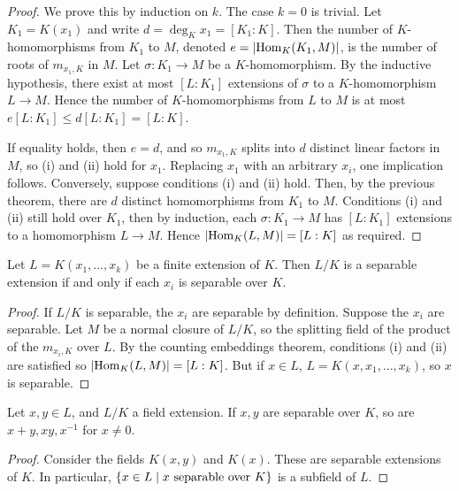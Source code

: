 \begin{proof}
	We prove this by induction on \( k \).
	The case \( k = 0 \) is trivial.
	Let \( K_1 = K(x_1) \) and write \( d = \deg_K x_1 = [K_1 : K] \).
	Then the number of \( K \)-homomorphisms from \( K_1 \) to \( M \), denoted \( e = \abs{\mathrm{Hom}_K(K_1,M)} \), is the number of roots of \( m_{x_1,K} \) in \( M \).
	Let \( \sigma : K_1 \to M \) be a \( K \)-homomorphism.
	By the inductive hypothesis, there exist at most \( [L : K_1] \) extensions of \( \sigma \) to a \( K \)-homomorphism \( L \to M \).
	Hence the number of \( K \)-homomorphisms from \( L \) to \( M \) is at most \( e[L : K_1] \leq d[L : K_1] = [L : K] \).

	If equality holds, then \( e = d \), and so \( m_{x_1,K} \) splits into \( d \) distinct linear factors in \( M \), so (i) and (ii) hold for \( x_1 \).
	Replacing \( x_1 \) with an arbitrary \( x_i \), one implication follows.
	Conversely, suppose conditions (i) and (ii) hold.
	Then, by the previous theorem, there are \( d \) distinct homomorphisms from \( K_1 \) to \( M \).
	Conditions (i) and (ii) still hold over \( K_1 \), then by induction, each \( \sigma \colon K_1 \to M \) has \( [L : K_1] \) extensions to a homomorphism \( L \to M \).
	Hence \( \abs{\mathrm{Hom}_K(L,M)} = [L : K] \) as required.
\end{proof}
\begin{theorem}
	Let \( L = K(x_1, \dots, x_k) \) be a finite extension of \( K \).
	Then \( L / K \) is a separable extension if and only if each \( x_i \) is separable over \( K \).
\end{theorem}
\begin{proof}
	If \( L / K \) is separable, the \( x_i \) are separable by definition.
	Suppose the \( x_i \) are separable.
	Let \( M \) be a normal closure of \( L / K \), so the splitting field of the product of the \( m_{x_i,K} \) over \( L \).
	By the counting embeddings theorem, conditions (i) and (ii) are satisfied so \( \abs{\mathrm{Hom}_K(L,M)} = [L : K] \).
	But if \( x \in L \), \( L = K(x, x_1, \dots, x_k) \), so \( x \) is separable.
\end{proof}
\begin{corollary}
	Let \( x, y \in L \), and \( L / K \) a field extension.
	If \( x, y \) are separable over \( K \), so are \( x + y, xy, x^{-1} \) for \( x \neq 0 \).
\end{corollary}
\begin{proof}
	Consider the fields \( K(x,y) \) and \( K(x) \).
	These are separable extensions of \( K \).
	In particular, \( \qty{x \in L \mid x \text{ separable over } K} \) is a subfield of \( L \).
\end{proof}
